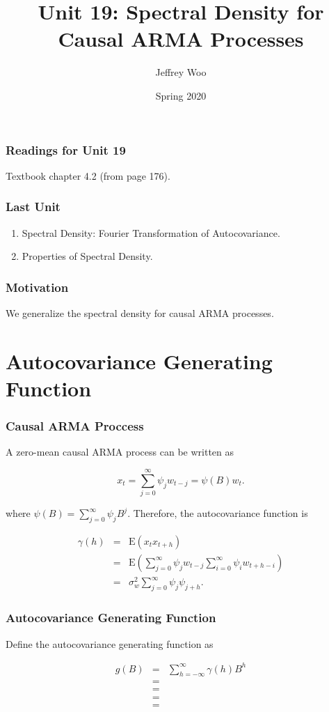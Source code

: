 \documentclass[%
xcolor=pdftex]{beamer}
\title{Unit 19: Spectral Density for Causal ARMA Processes}
\author[STAT 5170: Applied Time Series, Unit 19]{Jeffrey Woo}
\institute{Department of Statistics, University of Virginia}
\date{Spring 2020}
\begin{document}
\frame{\titlepage}

\begin{frame}
\frametitle{Readings for Unit 19}

Textbook chapter 4.2 (from page 176).

\end{frame}


\begin{frame}
\frametitle{Last Unit}
\begin{enumerate}
\item Spectral Density: Fourier Transformation of Autocovariance.
\item Properties of Spectral Density.
\end{enumerate}
\end{frame}

\begin{frame}
\frametitle{Motivation}

We generalize the spectral density for causal ARMA processes.

\end{frame}

\section{Autocovariance Generating Function}
\frame{\tableofcontents[currentsection]}

\begin{frame}
\frametitle{Causal ARMA Proccess}

A zero-mean causal ARMA process can be written as

$$
x_t = \sum_{j=0}^{\infty} \psi_j w_{t-j} = \psi(B)w_t.
$$

where $\psi(B) = \sum_{j=0}^{\infty} \psi_j B^j$. Therefore, the autocovariance function is

\begin{eqnarray*}
\gamma(h) &=& \mbox{E}(x_t x_{t+h}) \\
          &=& \mbox{E}(\sum_{j=0}^{\infty} \psi_j w_{t-j} \sum_{i=0}^{\infty} \psi_i w_{t+h-i}) \\
          &=& \sigma_w^2 \sum_{j=0}^{\infty} \psi_j \psi_{j+h}.
\end{eqnarray*}

\end{frame}

\begin{frame}
\frametitle{Autocovariance Generating Function}

Define the autocovariance generating function as

\begin{eqnarray} \label{eq:generate}
g(B) &=& \sum_{h=-\infty}^{\infty} \gamma(h) B^h \\
          &=& \nonumber \\
          &=& \nonumber \\
          &=& \nonumber \\
          &=& \nonumber
\end{eqnarray}

\end{frame}
\end{document}
